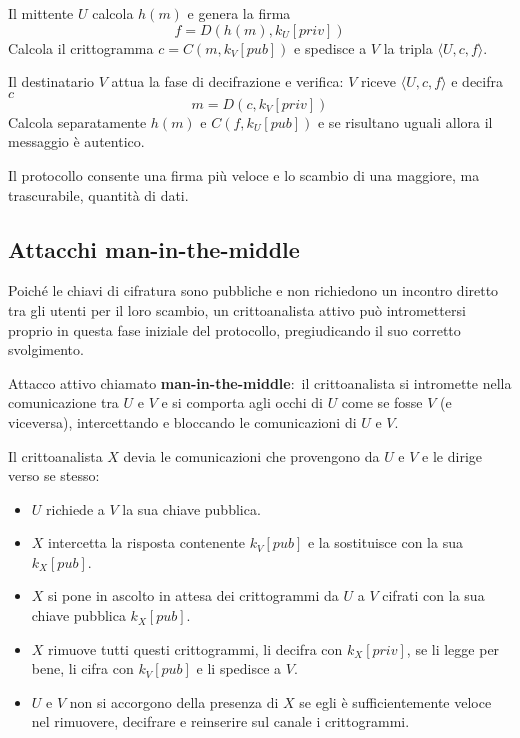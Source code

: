 \vspace{12pt}

\noindent Il mittente $U$ calcola $h(m)$ e genera la firma
\[f = D(h(m), k_U[\mathit{priv}])\]
Calcola il crittogramma $c = C(m, k_V[\mathit{pub}])$ e spedisce a $V$ la tripla $\langle U, c, f\rangle$.

\vspace{12pt}

\noindent Il destinatario $V$ attua la fase di decifrazione e verifica:
$V$ riceve $\langle U, c, f\rangle$ e decifra $c$ \[m = D(c, k_V[\mathit{priv}])\]
Calcola separatamente $h(m)$ e $C(f, k_U[\mathit{pub}])$ e se risultano uguali allora il messaggio è autentico.\

\vspace{12pt}

\noindent Il protocollo consente una firma più veloce e lo scambio di una maggiore, ma trascurabile, quantità di dati.

\subsection{Attacchi man-in-the-middle}

Poiché le chiavi di cifratura sono pubbliche e non richiedono un incontro diretto tra gli utenti per il loro scambio, un crittoanalista attivo può intromettersi proprio in questa fase iniziale del protocollo, pregiudicando il suo corretto svolgimento.\

Attacco attivo chiamato \textbf{man-in-the-middle}:\ il crittoanalista si intromette nella comunicazione tra $U$ e $V$ e si comporta agli occhi di $U$ come se fosse $V$ (e viceversa), intercettando e bloccando le comunicazioni di $U$ e $V$.\

Il crittoanalista $X$ devia le comunicazioni che provengono da $U$ e $V$ e le dirige verso se stesso:
\begin{itemize}
    \item $U$ richiede a $V$ la sua chiave pubblica.
    \item $X$ intercetta la risposta contenente $k_V[\mathit{pub}]$ e la sostituisce con la sua $k_X[\mathit{pub}]$.
    \item $X$ si pone in ascolto in attesa dei crittogrammi da $U$ a $V$ cifrati con la sua chiave pubblica $k_X[\mathit{pub}]$.
    \item $X$ rimuove tutti questi crittogrammi, li decifra con $k_X[\mathit{priv}]$, se li legge per bene, li cifra con $k_V[\mathit{pub}]$ e li spedisce a $V$.
    \item $U$ e $V$ non si accorgono della presenza di $X$ se egli è sufficientemente veloce nel rimuovere, decifrare e reinserire sul canale i crittogrammi.
\end{itemize}

